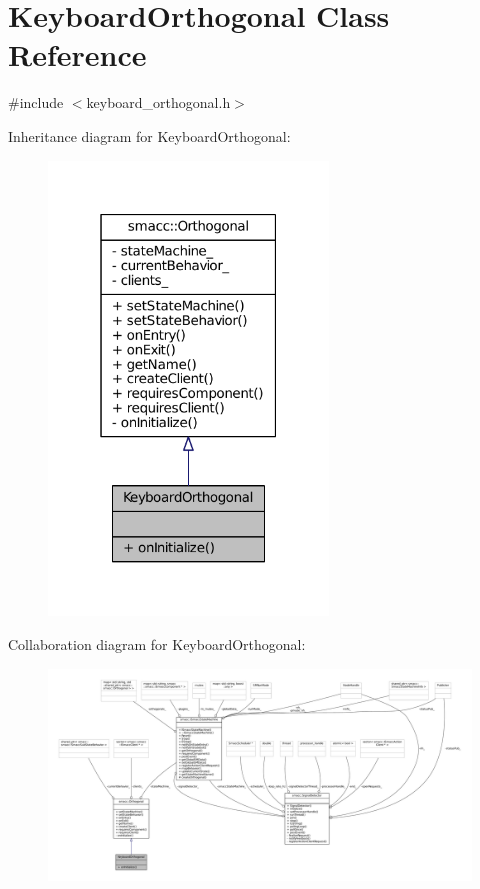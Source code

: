 \hypertarget{classKeyboardOrthogonal}{}\section{Keyboard\+Orthogonal Class Reference}
\label{classKeyboardOrthogonal}


{\ttfamily \#include $<$keyboard\+\_\+orthogonal.\+h$>$}



Inheritance diagram for Keyboard\+Orthogonal\+:
\nopagebreak
\begin{figure}[H]
\begin{center}
\leavevmode
\includegraphics[width=211pt]{classKeyboardOrthogonal__inherit__graph}
\end{center}
\end{figure}


Collaboration diagram for Keyboard\+Orthogonal\+:
\nopagebreak
\begin{figure}[H]
\begin{center}
\leavevmode
\includegraphics[width=350pt]{classKeyboardOrthogonal__coll__graph}
\end{center}
\end{figure}
